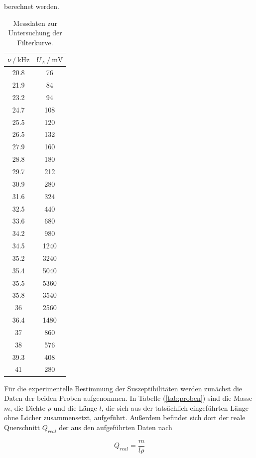\noindent
berechnet werden.

\begin{table}
\centering
\caption{Messdaten zur Untersuchung der Filterkurve.}
\begin{tabular}{c c}
\toprule
{$\nu \mathbin{/} \si{\kilo\hertz} $} & {$U_A \mathbin{/} \si{\milli\volt}$}  \\
\midrule
20.8  &    76 \\
21.9  &    84 \\
23.2  &    94 \\
24.7  &   108 \\
25.5  &   120 \\
26.5  &   132 \\
27.9  &   160 \\
28.8  &   180 \\
29.7  &   212 \\
30.9  &   280 \\
31.6  &   324 \\
32.5  &   440 \\
33.6  &   680 \\
34.2  &   980 \\
34.5  &  1240 \\
35.2  &  3240 \\
35.4  &  5040 \\
35.5  &  5360 \\
35.8  &  3540 \\
36    &  2560 \\
36.4  &  1480 \\
37    &   860 \\
38    &   576 \\
39.3  &   408 \\
41    &   280 \\
\bottomrule
\end{tabular}
\label{tab:selektiv}
\end{table}

\newpage
\noindent
Für die experimentelle Bestimmung der Suszeptibilitäten werden zunächst die Daten der beiden Proben aufgenommen.
In Tabelle (\ref{tab:proben}) sind die Masse $m$, die Dichte $\rho$ und die Länge $l$, 
die sich aus der tatsächlich eingeführten Länge ohne Löcher zusammensetzt, aufgeführt.
Außerdem befindet sich dort der reale Querschnitt $Q_{real}$ 
der aus den aufgeführten Daten nach 

\begin{equation}
Q_{real} = \frac{m}{l\rho}
\end{equation}

